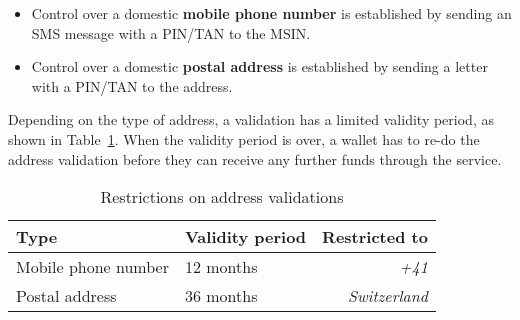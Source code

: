 \begin{itemize}
\item Control over a domestic {\bf mobile phone number} is established
  by sending an SMS message with a PIN/TAN to the MSIN.
\item Control over a domestic {\bf postal address} is established by
  sending a letter with a PIN/TAN to the address.
\end{itemize}

Depending on the type of address, a validation has a limited validity period,
as shown in Table~\ref{table:proc:domestic}.  When the validity period is
over, a wallet has to re-do the address validation before they can receive any
further funds through the service.

\begin{table}[h!]
  \caption{Restrictions on address validations}
  \label{table:proc:domestic}
  \begin{tabular}{l|l|r}
    {\bf Type}          & {\bf Validity period} & {\bf Restricted to} \\ \hline \hline
    Mobile phone number & 12 months             & {\em +41} \\
    Postal address      & 36 months             & {\em Switzerland} \\
  \end{tabular}
\end{table}
